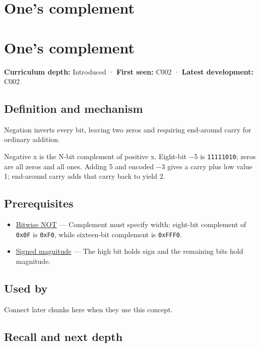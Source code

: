 \hypertarget{appendix-03c678cd40b3}{}
\section*{One's complement}
\section{One's complement}\label{ones-complement}

\textbf{Curriculum depth:} Introduced · \textbf{First seen:} C002 · \textbf{Latest development:} C002

\subsection{Definition and mechanism}\label{definition-and-mechanism}

Negation inverts every bit, leaving two zeros and requiring end-around carry for ordinary addition.

Negative x is the N-bit complement of positive x. Eight-bit −5 is \texttt{11111010}; zeros are all zeros and all ones. Adding 5 and encoded −3 gives a carry plus low value 1; end-around carry adds that carry back to yield 2.

\subsection{Prerequisites}\label{prerequisites}

\begin{itemize}
\tightlist
\item
  \hyperref[appendix-8f38927cfc54]{Bitwise NOT} --- Complement must specify width: eight-bit complement of \texttt{0x0F} is \texttt{0xF0}, while sixteen-bit complement is \texttt{0xFFF0}.
\item
  \hyperref[appendix-ce20506c8532]{Signed magnitude} --- The high bit holds sign and the remaining bits hold magnitude.
\end{itemize}

\subsection{Used by}\label{used-by}

Connect later chunks here when they use this concept.

\subsection{Recall and next depth}\label{recall-and-next-depth}

